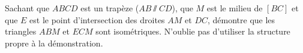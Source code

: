 \documentclass[../partie2.tex]{subfiles}
\begin{document}
\begin{solution}

\end{solution}
\newpage
\begin{exercise}[points=3]
    Sachant que $ABCD$ est un trapèze ($AB\sslash CD$), que $M$ est le milieu de $[BC]$ et que $E$ est le point d'intersection des droites $AM$ et $DC$, démontre que les triangles $ABM$ et $ECM$ sont isométriques. N'oublie pas d'utiliser la structure propre à la démonstration.
    \begin{center}
        
    \end{center}
\end{exercise}
\begin{solution}

\end{solution}
\end{document}
